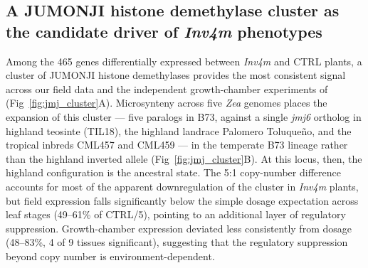 \documentclass[9pt,twocolumn,twoside]{rilabRxiv}
\newcommand{\invfour}{\textit{Inv4m}\xspace}
\begin{document}


\subsection*{A JUMONJI histone demethylase cluster as the candidate driver of \invfour phenotypes}
 
Among the 465 genes differentially expressed between \invfour and CTRL plants, a cluster of JUMONJI histone demethylases provides the most consistent signal across our field data and the independent growth-chamber experiments of \cite{crow2020} (Fig~\ref{fig:jmj_cluster}A).
Microsynteny across five \textit{Zea} genomes places the expansion of this cluster --- five paralogs in B73, against a single \textit{jmj6} ortholog in highland teosinte (TIL18), the highland landrace Palomero Toluque\~{n}o, and the tropical inbreds CML457 and CML459 --- in the temperate B73 lineage rather than the highland inverted allele (Fig~\ref{fig:jmj_cluster}B).
At this locus, then, the highland configuration is the ancestral state.
The 5:1 copy-number difference accounts for most of the apparent downregulation of the cluster in \invfour plants, but field expression falls significantly below the simple dosage expectation across leaf stages (49--61\% of CTRL/5), pointing to an additional layer of regulatory suppression.
Growth-chamber expression deviated less consistently from dosage (48--83\%, 4 of 9 tissues significant), suggesting that the regulatory suppression beyond copy number is environment-dependent.
 
\end{document}
